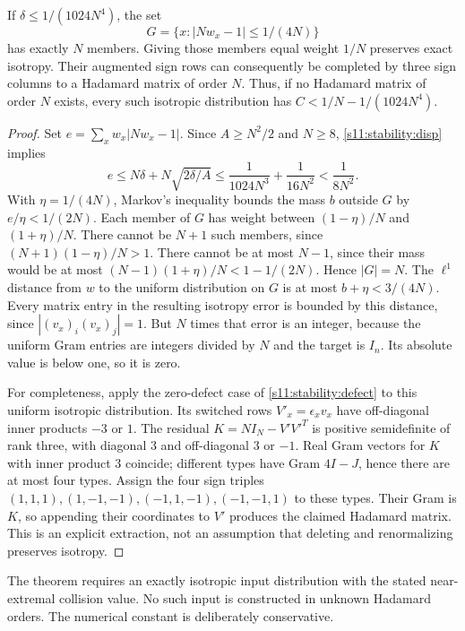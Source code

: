 \begin{theorem}
If $\delta\le1/(1024N^4)$, the set
\[
 G=\{x:|Nw_x-1|\le1/(4N)\}
\]
has exactly $N$ members. Giving those members equal weight $1/N$
preserves exact isotropy. Their augmented sign rows can consequently
be completed by three sign columns to a Hadamard matrix of order $N$.
Thus, if no Hadamard matrix of order $N$ exists, every such isotropic
distribution has $C<1/N-1/(1024N^4)$.
\end{theorem}
\begin{proof}
Set $e=\sum_xw_x|Nw_x-1|$. Since $A\ge N^2/2$ and $N\ge8$,
\eqref{s11:stability:disp} implies
\[
 e\le N\delta+N\sqrt{2\delta/A}
 \le\frac1{1024N^3}+\frac1{16N^2}<\frac1{8N^2}.
\]
With $\eta=1/(4N)$, Markov's inequality bounds the mass $b$ outside
$G$ by $e/\eta<1/(2N)$. Each member of $G$ has weight between
$(1-\eta)/N$ and $(1+\eta)/N$. There cannot be $N+1$ such members,
since $(N+1)(1-\eta)/N>1$. There cannot be at most $N-1$, since
their mass would be at most $(N-1)(1+\eta)/N<1-1/(2N)$.
Hence $|G|=N$.
The $\ell^1$ distance from $w$ to the uniform distribution on $G$ is
at most $b+\eta<3/(4N)$. Every matrix entry in the resulting isotropy
error is bounded by this distance, since $|(v_x)_i(v_x)_j|=1$.
But $N$ times that error is an integer, because the uniform Gram
entries are integers divided by $N$ and the target is $I_n$.
Its absolute value is below one, so it is zero.

For completeness, apply the zero-defect case of \eqref{s11:stability:defect} to
this uniform isotropic distribution. Its switched rows
$V'_x=\epsilon_xv_x$ have off-diagonal inner products $-3$ or $1$.
The residual $K=NI_N-V'V'^T$ is positive semidefinite of rank three,
with diagonal $3$ and off-diagonal $3$ or $-1$. Real Gram vectors for
$K$ with inner product $3$ coincide; different types have Gram
$4I-J$, hence there are at most four types. Assign the four sign
triples $(1,1,1),(1,-1,-1),(-1,1,-1),(-1,-1,1)$ to these types.
Their Gram is $K$, so appending their coordinates to $V'$ produces
the claimed Hadamard matrix. This is an explicit extraction, not an
assumption that deleting and renormalizing preserves isotropy.
\end{proof}

The theorem requires an exactly isotropic input distribution with the
stated near-extremal collision value. No such input is constructed in
unknown Hadamard orders. The numerical constant is deliberately
conservative.


